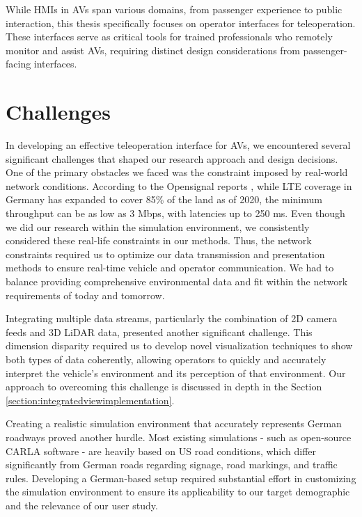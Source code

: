While \acp{HMI} in \acp{AV} span various domains, from passenger experience to public interaction, this thesis specifically focuses on operator interfaces for teleoperation. These interfaces serve as critical tools for trained professionals who remotely monitor and assist \acp{AV}, requiring distinct design considerations from passenger-facing interfaces.

\section{Challenges}\label{section:challenges}

In developing an effective teleoperation interface for \acp{AV}, we encountered several significant challenges that shaped our research approach and design decisions.
One of the primary obstacles we faced was the constraint imposed by real-world network conditions.
According to the Opensignal reports \cite{opensignal2020germany}, while LTE coverage in Germany has expanded to cover 85\% of the land as of 2020,
the minimum throughput can be as low as 3 Mbps, with latencies up to 250 ms. Even though we did our research within the simulation environment,
we consistently considered these real-life constraints in our methods. Thus, the network constraints required us to optimize our data transmission and presentation methods to ensure
real-time vehicle and operator communication. We had to balance providing comprehensive environmental data and fit within the network requirements of today and tomorrow.

Integrating multiple data streams, particularly the combination of 2D camera feeds and 3D \ac{LiDAR} data, presented another significant challenge.
This dimension disparity required us to develop novel visualization techniques to show both types of data coherently, allowing operators
to quickly and accurately interpret the vehicle's environment and its perception of that environment. Our approach to overcoming this challenge is
discussed in depth in the Section \ref{section:integratedviewimplementation}.

Creating a realistic simulation environment that accurately represents German roadways proved another hurdle. Most existing simulations - such as open-source CARLA software \cite{Dosovitskiy2017CARLAAO} - are heavily based on US road conditions, which differ significantly from German roads regarding signage, road markings, and traffic rules. Developing a German-based setup required substantial effort in customizing the simulation environment to ensure its applicability to our target demographic and the relevance of our user study.

